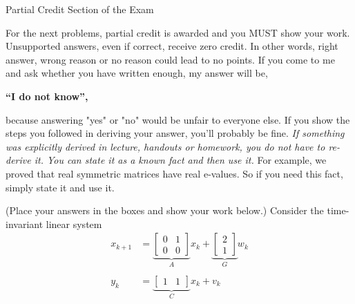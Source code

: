\documentclass[letterpaper]{article}
\begin{document}
\newpage

\vspace*{.7in}
\begin{center}
\huge

Partial Credit Section of the Exam

\end{center}



\vspace*{1in}

{\Large  For the next problems, partial credit is awarded and you MUST show your work. Unsupported answers, even if correct, receive zero credit. In other words, right answer, wrong
reason or no reason could lead to no points. If you come to me and ask whether you have written enough, my answer will be,
\begin{center}
\bf ``I do not know'',
\end{center}
 because answering "yes" or "no"  would be unfair to everyone else. If you show the steps you followed in deriving your answer, you'll probably be fine.
  \emph{If something was explicitly derived in lecture, handouts or homework, you do not have to re-derive it. You can state it as a known fact and then use it.} For example, we proved that real symmetric matrices have real e-values. So if you need this fact, simply state it and use it.}

%
%



  \newpage


 (Place your answers in the boxes and show your work below.) Consider  the time-invariant linear system
  \begin{align*}
  x_{k+1} &= \underbrace{\left[ \begin{array}{rr} 0 & 1\\ 0 & 0\end{array} \right]}_{A} x_k + \underbrace{\left[ \begin{array}{c} 2\\ 1\end{array} \right]}_{G} w_k \\
  \\
  y_k &=   \underbrace{\left[ \begin{array}{cc} 1 & 1\end{array} \right]}_{C} x_k + v_k
  \end{align*}
\end{document}
